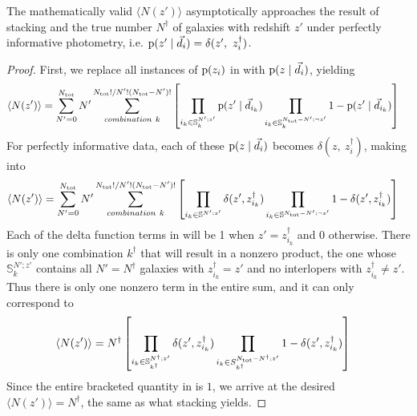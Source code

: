 \begin{theorem}
	\label{thm:informative}
	The mathematically valid $\langle N(z') \rangle$ asymptotically approaches the result of stacking and the true number $N^{\dagger}$ of galaxies with redshift $z'$ under perfectly informative photometry, i.e. $\pr{z' \gvn \data_{i}} = \delta(z',\ z^{\dagger}_{i})$.
\end{theorem}
\begin{proof}
	First, we replace all instances of $\mathrm{p}(z_{i})$ in  with $\mathrm{p}(z \mid \vec{d}_{i})$, yielding
	\begin{align}
	\eqlabel{eqn:proofwithdata1}
	\langle N(z') \rangle &= \sum_{N' = 0}^{\ntot} N' \sum_{combination\ k}^{\ntot! / N'! (\ntot - N')!} \left[ \prod_{i_{k} \in \mathbb{S}^{N'; z'}_{k}} \pr{z' \gvn \data_{i_{k}}} \prod_{i_{k} \in \mathbb{S}^{\ntot - N'; \lnot z'}_{k}} 1 - \pr{z' \gvn \data_{i_{k}}} \right]
	\end{align}
	For perfectly informative data, each of these $\mathrm{p}(z \mid \vec{d}_{i})$ becomes $\delta(z,\ z^{\dagger}_{i})$, making  into
	\begin{align}
	\eqlabel{eqn:proofwithdata2}
	\langle N(z') \rangle &= \sum_{N' = 0}^{\ntot} N' \sum_{combination\ k}^{\ntot! / N'! (\ntot - N')!} \left[ \prod_{i_{k} \in \mathbb{S}^{N'; z'}} \delta(z', z^{\dagger}_{i_{k}}) \prod_{i_{k} \in \mathbb{S}^{\ntot - N'; \lnot z'}} 1 - \delta(z', z^{\dagger}_{i_{k}}) \right]
	\end{align}
	Each of the delta function terms in  will be 1 when $z' = z^{\dagger}_{i_{k}}$ and 0 otherwise.
	There is only one combination $k^{\dagger}$ that will result in a nonzero product, the one whose $\mathbb{S}^{N'; z'}_{k}$ contains all $N' = N^{\dagger}$ galaxies with $z^{\dagger}_{i_{k}} = z'$ and no interlopers with $z^{\dagger}_{i_{k}} \neq z'$.
	Thus there is only one nonzero term in the entire sum, and it can only correspond to 
	\begin{align}
	\eqlabel{eqn:proofwithdata3}
	\langle N(z') \rangle &= N^{\dagger} \left[ \prod_{i_{k} \in \mathbb{S}^{N^{\dagger}; z'}_{k^{\dagger}}} \delta(z', z^{\dagger}_{i_{k}}) \prod_{i_{k} \in S^{\ntot - N^{\dagger}; z'}_{k^{\dagger}}} 1 - \delta(z', z^{\dagger}_{i_{k}}) \right]
	\end{align}
	Since the entire bracketed quantity in  is $1$, we arrive at the desired $\langle N(z') \rangle = N^{\dagger}$, the same as what stacking yields.
\end{proof}

